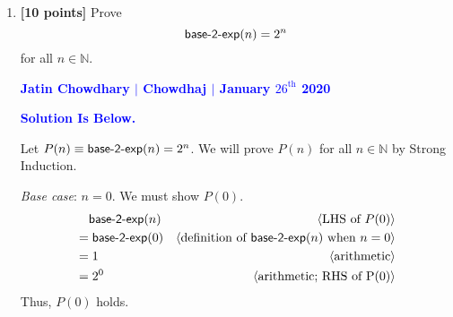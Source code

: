 \documentclass[11pt,fleqn]{article}
\newcommand{\mname}[1]{\mbox{\sf #1}}
\newcommand{\pnote}[1]{{\langle \text{#1} \rangle}}
\begin{document}
\begin{enumerate}
\begin{proof}
\emph{Induction step}: $n \ge 0$. Assume $P(n)$. We must show $P(n + 1)$.
\begin{align*}
  &\phantom{{}=} 
  \prod_{i=1}^{n + 1} \frac{i^2}{i + 1}      
        & \pnote{LHS of $ P(n + 1) $}\\
  &= \prod_{i=1}^{(n + 1) - 1} \frac{i^2}{i + 1} * \frac{(n + 1)^ 2}{(n + 1) + 1}   
        & \pnote{definition of $\textstyle{\prod}_{i=m}^{n} f(i)$}\\
  &= \prod_{i=1}^{n} \frac{i^2}{i + 1} * \frac{(n + 1)^ 2}{(n + 1) + 1}   
        & \pnote{arithmetic}\\
  &= \frac{\mname{fact}{(n)}}{n + 1} * \frac{(n + 1)^ 2}{(n + 1) + 1}    
        & \pnote{induction hypothesis: $P(n)$}\\
  &= \frac{\mname{fact}{(n)}}{1} * \frac{(n + 1)}{(n + 1) + 1}
        & \pnote{arithmetic: cross simplify}\\
  &= \frac{(n + 1)(\mname{fact}{(n)})}{(n + 1) + 1}                             
        & \pnote{arithmetic: multiply across}\\
  &= \frac{(n + 1)(\mname{fact}{(n)})}{(n + 1) + 1}                             
        & \pnote{definition of fact when $m \le n$}\\
  &= \frac{(\mname{fact}{(n + 1)})}{(n + 1) + 1}                             
        & \pnote{RHS of $P(n + 1)$}
\end{align*}
Thus, $P(n + 1)$ holds.

\medskip

Therefore, $P(n)$ holds for all $n \in \mathbb{N}$ by weak induction.
\end{proof}

  \bigskip

  \item \textbf{[10 points]} Prove \[\mname{base-2-exp}(n) = 2^n\] for
    all $n \in \mathbb{N}$.

  \bigskip

  \textcolor{blue}{\textbf{Jatin Chowdhary $\vert$ Chowdhaj $\vert$ January $26^{\text{th}}$ 2020}}

  \textcolor{blue}{\textbf{Solution Is Below.}}
  
  \bigskip
  
  Let $P(n) \equiv \mname{base-2-exp}(n) = 2^n$.  We will prove $P(n)$ for all $n \in \mathbb{N}$ by Strong Induction.
  
\emph{Base case}: $n = 0$.  We must show $P(0)$.
\begin{align*}
  &\phantom{{}=} 
  \mname{base-2-exp}(n)                   
        & \pnote{LHS of $P(0)$}\\
  &= \mname{base-2-exp}(0)                                   
        & \pnote{definition of $\textstyle{\mname{base-2-exp}(n)}$ when $n = 0$}\\
  &= 1                       
        & \pnote{arithmetic}\\
  &= 2^0                  
        & \pnote{arithmetic; RHS of P(0)}
\end{align*}
Thus, $P(0)$ holds.


\end{enumerate}
\end{document}
